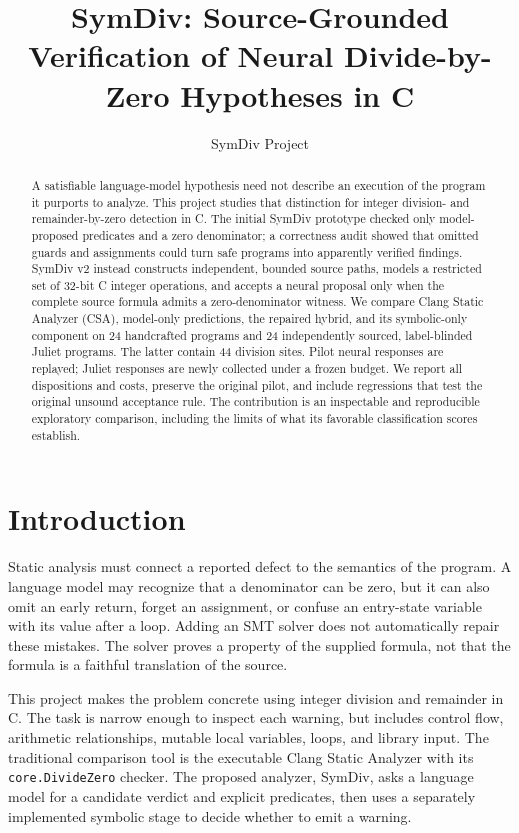 \documentclass[sigconf]{acmart}
\title{SymDiv: Source-Grounded Verification of Neural Divide-by-Zero Hypotheses in C}
\author{SymDiv Project}
\begin{document}
\begin{abstract}
A satisfiable language-model hypothesis need not describe an execution of the
program it purports to analyze. This project studies that distinction for
integer division- and remainder-by-zero detection in C. The initial SymDiv
prototype checked only model-proposed predicates and a zero denominator; a
correctness audit showed that omitted guards and assignments could turn safe
programs into apparently verified findings. SymDiv v2 instead constructs
independent, bounded source paths, models a restricted set of 32-bit C integer
operations, and accepts a neural proposal only when the complete source formula
admits a zero-denominator witness. We compare Clang Static Analyzer (CSA),
model-only predictions, the repaired hybrid, and its symbolic-only component
on 24 handcrafted programs and 24 independently sourced, label-blinded Juliet
programs. The latter contain 44 division sites. Pilot neural responses are
replayed; Juliet responses are newly collected under a frozen budget.
\AbstractResults{}
We report all dispositions and costs, preserve the original pilot, and include
regressions that test the original unsound acceptance rule. The contribution is
an inspectable and reproducible exploratory comparison, including the limits
of what its favorable classification scores establish.
\end{abstract}
\maketitle

\section{Introduction}
Static analysis must connect a reported defect to the semantics of the program.
A language model may recognize that a denominator can be zero, but it can also
omit an early return, forget an assignment, or confuse an entry-state variable
with its value after a loop. Adding an SMT solver does not automatically repair
these mistakes. The solver proves a property of the supplied formula, not that
the formula is a faithful translation of the source.

This project makes the problem concrete using integer division and remainder
in C. The task is narrow enough to inspect each warning, but includes control
flow, arithmetic relationships, mutable local variables, loops, and library
input. The traditional comparison tool is the executable Clang Static Analyzer
with its \texttt{core.DivideZero} checker. The proposed analyzer, SymDiv, asks a
language model for a candidate verdict and explicit predicates, then uses a
separately implemented symbolic stage to decide whether to emit a warning.
\end{document}
